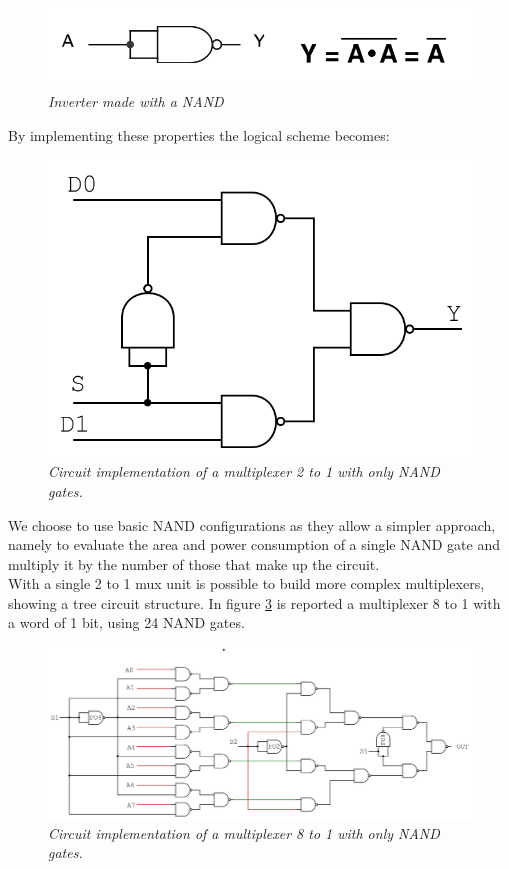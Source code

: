 \begin{figure}[!h]
	\centering
	\includegraphics[scale=0.6]{immagini/not_nand.png}
	\caption{\textit{Inverter made with a NAND}} 
	\label{not}
\end{figure}
\newline
By implementing these properties the logical scheme becomes:
\begin{figure}[!h]
	\centering
	\includegraphics[scale=0.4]{immagini/2_to_1_1bit}
	\caption{\textit{Circuit implementation of a  multiplexer 2 to 1 with only NAND gates.}} 
	\label{2_to_1_1bit}
\end{figure}
We choose to use basic NAND configurations as they allow a simpler approach, namely to evaluate the area and power consumption of a single NAND gate and multiply it by the number of those that make up the circuit.\\ With a single 2 to 1 mux unit is possible to build more complex multiplexers, showing a tree circuit structure. In figure \ref{8_to_1_1bit} is reported a multiplexer 8 to 1  with a word of 1 bit, using 24 NAND gates.
\begin{figure}[!h]
	\centering
	\includegraphics[scale=0.15]{immagini/8_to_1_1bit}
	\caption{\textit{Circuit implementation of a  multiplexer 8 to 1 with only NAND gates.}} 
	\label{8_to_1_1bit}
\end{figure}
\newpage
